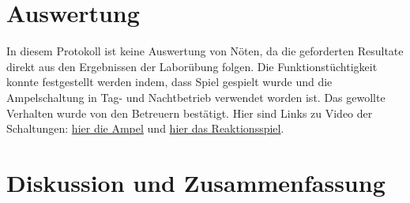 \documentclass[12pt,english,ngerman]{scrartcl}
\begin{document}
\section{Auswertung}\label{sec:Auswertung}
In diesem Protokoll ist keine Auswertung von Nöten, da die geforderten Resultate
direkt aus den Ergebnissen der Laborübung folgen. Die Funktionstüchtigkeit konnte 
festgestellt werden indem, dass Spiel gespielt wurde und die Ampelschaltung in Tag- und 
Nachtbetrieb verwendet worden ist. Das gewollte Verhalten wurde von den Betreuern bestätigt.
Hier sind Links zu Video der Schaltungen:
\href{https://www.dropbox.com/s/m3baaixz73scpv5/ampel.mp4?dl=0}{hier die Ampel} und 
\href{https://www.dropbox.com/s/5phbn6uqrtiq1w0/game.mp4?dl=0}{hier das Reaktionsspiel}.



\section{Diskussion und Zusammenfassung}\label{sec:Diskussion} 
\end{document}
